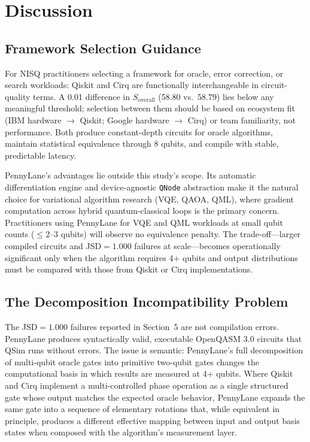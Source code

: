\section{Discussion}

\subsection{Framework Selection Guidance}

For NISQ practitioners selecting a framework for oracle, error
correction, or search workloads: Qiskit and Cirq are functionally
interchangeable in circuit-quality terms.
A 0.01 difference in $S_{\text{overall}}$ (58.80 vs.\ 58.79) lies below
any meaningful threshold; selection between them should be based on
ecosystem fit (IBM hardware $\to$ Qiskit; Google hardware $\to$ Cirq)
or team familiarity, not performance.
Both produce constant-depth circuits for oracle algorithms, maintain
statistical equivalence through 8 qubits, and compile with stable,
predictable latency.

PennyLane's advantages lie outside this study's scope.
Its automatic differentiation engine and device-agnostic \texttt{QNode}
abstraction make it the natural choice for variational algorithm research
(VQE, QAOA, QML), where gradient computation across hybrid
quantum-classical loops is the primary concern.
Practitioners using PennyLane for VQE and QML workloads at small qubit
counts ($\leq$2--3 qubits) will observe no equivalence penalty.
The trade-off---larger compiled circuits and JSD$=1.000$ failures at
scale---becomes operationally significant only when the algorithm
requires 4+ qubits and output distributions must be compared with those
from Qiskit or Cirq implementations.

\subsection{The Decomposition Incompatibility Problem}

The JSD$=1.000$ failures reported in Section~5 are not compilation
errors.
PennyLane produces syntactically valid, executable OpenQASM 3.0 circuits
that QSim runs without errors.
The issue is semantic: PennyLane's full decomposition of multi-qubit
oracle gates into primitive two-qubit gates changes the computational
basis in which results are measured at 4+ qubits.
Where Qiskit and Cirq implement a multi-controlled phase operation as a
single structured gate whose output matches the expected oracle behavior,
PennyLane expands the same gate into a sequence of elementary rotations
that, while equivalent in principle, produces a different effective
mapping between input and output basis states when composed with the
algorithm's measurement layer.

